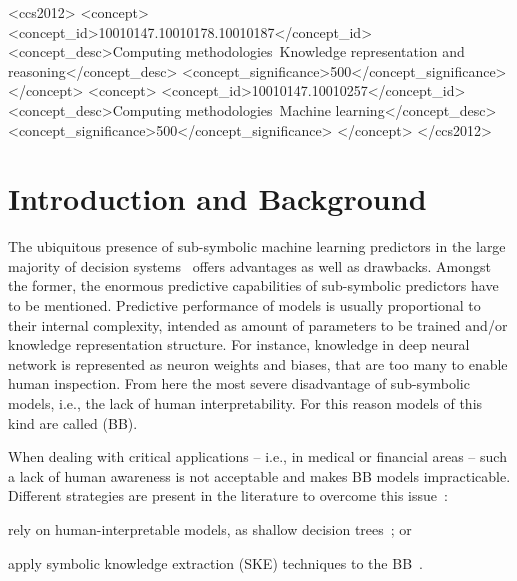\documentclass[sigconf]{acmart}
\begin{document}
\begin{CCSXML}
	<ccs2012>
	<concept>
	<concept_id>10010147.10010178.10010187</concept_id>
	<concept_desc>Computing methodologies~Knowledge representation and reasoning</concept_desc>
	<concept_significance>500</concept_significance>
	</concept>
	<concept>
	<concept_id>10010147.10010257</concept_id>
	<concept_desc>Computing methodologies~Machine learning</concept_desc>
	<concept_significance>500</concept_significance>
	</concept>
	</ccs2012>
\end{CCSXML}



\maketitle

\section{Introduction and Background}

The ubiquitous presence of sub-symbolic machine learning predictors in the large majority of decision systems~\cite{rocha2012far} offers advantages as well as drawbacks.
%
Amongst the former, the enormous predictive capabilities of sub-symbolic predictors have to be mentioned.
%
Predictive performance of models is usually proportional to their internal complexity, intended as amount of parameters to be trained and/or knowledge representation structure.
%
For instance, knowledge in deep neural network is represented as neuron weights and biases, that are too many to enable human inspection.
%
From here the most severe disadvantage of sub-symbolic models, i.e., the lack of human interpretability.
%
For this reason models of this kind are called  (BB).

When dealing with critical applications -- i.e., in medical or financial areas -- such a lack of human awareness is not acceptable and makes BB models impracticable.
%
Different strategies are present in the literature to overcome this issue~\cite{guidotti2018survey}:
%
\begin{inlinelist}
	\item rely on human-interpretable models, as shallow decision trees~\cite{Rudin2019}; or
	\item apply symbolic knowledge extraction (SKE) techniques to the BB~\cite{KENNY2021103459}.
\end{inlinelist}
\end{document}
